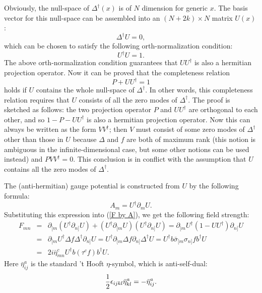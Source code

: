 \documentclass[a4paper,a4paper]{article}
\begin{document}
Obviously, the null-space of $\Delta^\dagger(x)$ is of $N$
dimension for generic $x$. The basis vector for this null-space
can be assembled into an $(N+2k)\times N$ matrix $U(x)$:
\begin{equation}
\Delta^\dag U=0,
\end{equation}
which can be chosen to satisfy the following orth-normalization
condition:
\begin{equation}
U^\dag U=1.
\end{equation}
The above orth-normalization condition guarantees that $UU^\dag$
is also a hermitian projection operator. Now it can be proved that
the completeness relation
\begin{equation}
\label{complete}
P+UU^\dag=1
\end{equation}
holds if $U$ contains the whole null-space of $\Delta^\dagger$. In
other words, this completeness relation requires that $U$ consists
of all the zero modes of $\Delta^\dagger$. The proof is sketched
as follows: the two projection operator $P$ and $UU^\dag$ are
orthogonal to each other, and so $1-P-UU^\dag$ is also a hermitian
projection operator. Now this can always be written as the form
$VV^\dag$; then $V$ must consist of some zero modes of
$\Delta^\dagger$ other than those in $U$ because $\Delta$ and $f$
are both of maximum rank (this notion is ambiguous in the
infinite-dimensional case, but some other notions can be used
instead) and $PVV^\dag=0$. This conclusion is in conflict with the
assumption that $U$ contains all the zero modes of
$\Delta^\dagger$.

The (anti-hermitian) gauge potential is constructed from $U$ by
the following formula:
\begin{equation}
A_m= U^\dag\partial_m U.
\end{equation}
Substituting this expression into (\ref{F by A}), we get the
following field strength:
\begin{eqnarray}
\label{calculate F}
F_{mn}&=&\partial_{[m}(U^\dag\partial_{n]}U)
+(U^\dag\partial_{[m}U)(U^\dag\partial_{n]}U)
=\partial_{[m}U^\dag(1-UU^\dag)\partial_{n]}U\nonumber\\
&=&\partial_{[m}U^\dag\Delta f\Delta^\dag\partial_{n]}U
=U^\dag\partial_{[m}\Delta f\partial_{n]}\Delta^\dag U
=U^\dag b\bar\sigma_{[m}\sigma_{n]}f b^\dag U\nonumber\\
&=& 2i\bar\eta^c_{mn}U^\dag b(\tau^c f)b^\dag U.
\end{eqnarray}
Here $\bar\eta^a_{ij}$ is the standard 't Hooft $\eta$-symbol,
which is anti-self-dual:
\begin{equation}
\frac{1}{2}\epsilon_{ijkl}\bar\eta^a_{kl}=-\bar\eta^a_{ij}.
\end{equation}
\end{document}
